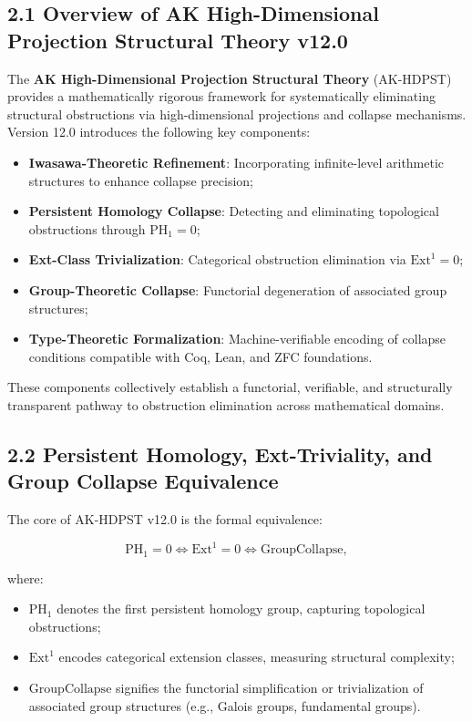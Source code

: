 \documentclass[11pt]{article}
\begin{document}
\subsection*{2.1 Overview of AK High-Dimensional Projection Structural Theory v12.0}

The \textbf{AK High-Dimensional Projection Structural Theory} (AK-HDPST) provides a mathematically rigorous framework for systematically eliminating structural obstructions via high-dimensional projections and collapse mechanisms. Version 12.0 introduces the following key components:

\begin{itemize}
    \item \textbf{Iwasawa-Theoretic Refinement}: Incorporating infinite-level arithmetic structures to enhance collapse precision;
    \item \textbf{Persistent Homology Collapse}: Detecting and eliminating topological obstructions through $\mathrm{PH}_1 = 0$;
    \item \textbf{Ext-Class Trivialization}: Categorical obstruction elimination via $\mathrm{Ext}^1 = 0$;
    \item \textbf{Group-Theoretic Collapse}: Functorial degeneration of associated group structures;
    \item \textbf{Type-Theoretic Formalization}: Machine-verifiable encoding of collapse conditions compatible with Coq, Lean, and ZFC foundations.
\end{itemize}

These components collectively establish a functorial, verifiable, and structurally transparent pathway to obstruction elimination across mathematical domains.

\subsection*{2.2 Persistent Homology, Ext-Triviality, and Group Collapse Equivalence}

The core of AK-HDPST v12.0 is the formal equivalence:

\[
\mathrm{PH}_1 = 0 \iff \mathrm{Ext}^1 = 0 \iff \mathrm{GroupCollapse},
\]

where:

\begin{itemize}
    \item $\mathrm{PH}_1$ denotes the first persistent homology group, capturing topological obstructions;
    \item $\mathrm{Ext}^1$ encodes categorical extension classes, measuring structural complexity;
    \item $\mathrm{GroupCollapse}$ signifies the functorial simplification or trivialization of associated group structures (e.g., Galois groups, fundamental groups).
\end{itemize}
\end{document}
